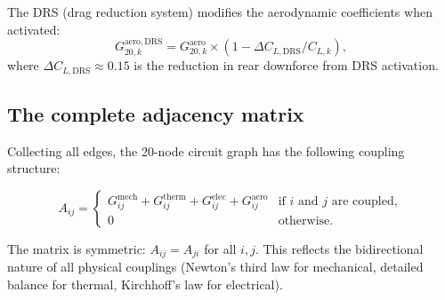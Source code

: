 \documentclass[twocolumn,10pt,a4paper]{article}
\theoremstyle{definition}
\theoremstyle{remark}
\begin{document}
The DRS (drag reduction system) modifies the aerodynamic coefficients when activated:
\begin{equation}\label{eq:drs}
    G_{20,k}^{\mathrm{aero,DRS}} = G_{20,k}^{\mathrm{aero}} \times (1 - \Delta C_{L,\mathrm{DRS}} / C_{L,k}),
\end{equation}
where $\Delta C_{L,\mathrm{DRS}} \approx 0.15$ is the reduction in rear downforce from DRS activation.

\subsection{The complete adjacency matrix}

Collecting all edges, the 20-node circuit graph has the following coupling structure:

\begin{equation}\label{eq:adjacency}
    A_{ij} = \begin{cases}
        G_{ij}^{\mathrm{mech}} + G_{ij}^{\mathrm{therm}} + G_{ij}^{\mathrm{elec}} + G_{ij}^{\mathrm{aero}} & \text{if $i$ and $j$ are coupled}, \\
        0 & \text{otherwise}.
    \end{cases}
\end{equation}

The matrix is symmetric: $A_{ij} = A_{ji}$ for all $i, j$. This reflects the bidirectional nature of all physical couplings (Newton's third law for mechanical, detailed balance for thermal, Kirchhoff's law for electrical).
\end{document}
